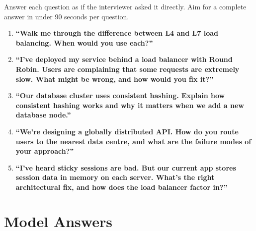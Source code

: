 \documentclass[11pt,a4paper]{article}
\begin{document}
\begin{quizbox}
  Answer each question as if the interviewer asked it directly. Aim for a complete answer in
  under 90 seconds per question.

  \begin{enumerate}[leftmargin=*, label=\textbf{Q\arabic*.}]

    \item \textbf{``Walk me through the difference between L4 and L7 load balancing. When would
    you use each?''}

    \item \textbf{``I've deployed my service behind a load balancer with Round Robin. Users are
    complaining that some requests are extremely slow. What might be wrong, and how would you fix
    it?''}

    \item \textbf{``Our database cluster uses consistent hashing. Explain how consistent hashing
    works and why it matters when we add a new database node.''}

    \item \textbf{``We're designing a globally distributed API. How do you route users to the
    nearest data centre, and what are the failure modes of your approach?''}

    \item \textbf{``I've heard sticky sessions are bad. But our current app stores session data
    in memory on each server. What's the right architectural fix, and how does the load balancer
    factor in?''}

  \end{enumerate}
\end{quizbox}

\newpage
\section*{Model Answers}
\end{document}
